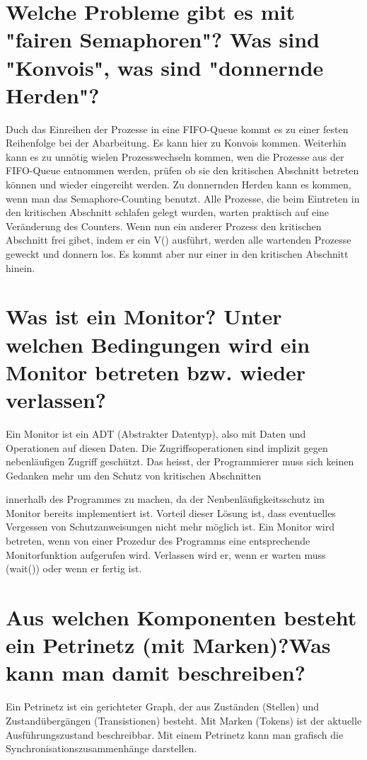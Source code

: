 \documentclass[12pt,a4paper,ngerman]{scrartcl}
\newcommand{\question}[1]{#1}
\newenvironment {answer}
                {}
                {}
\begin{document}
\section{\question{Welche Probleme gibt es mit "fairen Semaphoren"? Was sind "Konvois", was sind "donnernde Herden"?}}
\begin{answer}
Duch das Einreihen der Prozesse in eine FIFO-Queue kommt es zu einer festen Reihenfolge bei
der Abarbeitung. Es kann hier zu Konvois kommen. Weiterhin kann es zu unnötig wielen Prozesswechseln
kommen, wen die Prozesse aus der FIFO-Queue entnommen werden, prüfen ob sie den
kritischen Abschnitt betreten können und wieder eingereiht werden.
Zu donnernden Herden kann es kommen, wenn man das Semaphore-Counting benutzt. Alle Prozesse,
die beim Eintreten in den kritischen Abschnitt schlafen gelegt wurden, warten praktisch
auf eine Veränderung des Counters. Wenn nun ein anderer Prozess den kritischen Abschnitt frei
gibet, indem er ein V() ausführt, werden alle wartenden Prozesse geweckt und donnern los. Es
kommt aber nur einer in den kritischen Abschnitt hinein.
\end{answer}

\section{\question{Was ist ein Monitor? Unter welchen Bedingungen wird ein Monitor betreten bzw. wieder verlassen?}}
\begin{answer}
Ein Monitor ist ein ADT (Abstrakter Datentyp), also mit Daten und Operationen auf diesen
Daten. Die Zugriffsoperationen sind implizit gegen nebenläufigen Zugriff geschützt. Das heisst,
der Programmierer muss sich keinen Gedanken mehr um den Schutz von kritischen Abschnitten

innerhalb des Programmes zu machen, da der Nenbenläufigkeitsschutz im Monitor bereits implementiert
ist. Vorteil dieser Lösung ist, dass eventuelles Vergessen von Schutzanweisungen nicht
mehr möglich ist.
Ein Monitor wird betreten, wenn von einer Prozedur des Programms eine entsprechende Monitorfunktion
aufgerufen wird. Verlassen wird er, wenn er warten muss (wait()) oder wenn er fertig
ist.
\end{answer}

\section{\question{Aus welchen Komponenten besteht ein Petrinetz (mit Marken)?Was kann man damit beschreiben?}}
\begin{answer}
Ein Petrinetz ist ein gerichteter Graph, der aus Zuständen (Stellen) und Zustandübergängen
(Transistionen) besteht. Mit Marken (Tokens) ist der aktuelle Ausführungszustand beschreibbar.
Mit einem Petrinetz kann man grafisch die Synchronisationszusammenhänge darstellen.
\end{answer}
\end{document}
